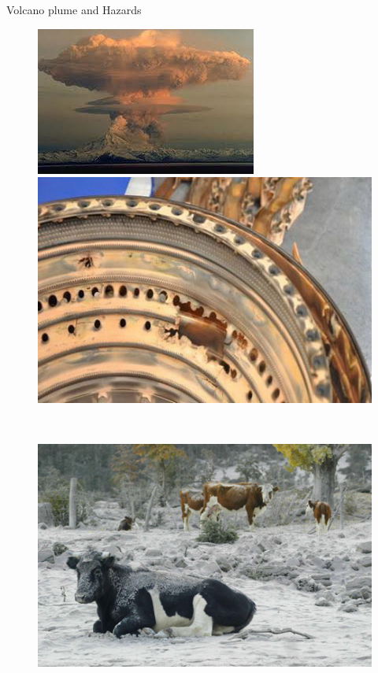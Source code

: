 \documentclass{beamer}
\begin{document}
\begin{frame}{Volcano plume and Hazards}
\noindent

\begin{figure}[!t]
\centering
\begin{minipage}{.49\textwidth}
\center
\includegraphics[width=.90\textwidth]{./PPT/Plume_pic}
\end{minipage}
\begin{minipage}{.49\textwidth}
\center
\includegraphics[width=.70\textwidth]{./PPT/BA-engine}
\end{minipage}
\\
\begin{minipage}{.32\textwidth}
\center
\includegraphics[width=.95\textwidth]{./PPT/Ash_community}

\end{minipage}
\end{figure}
\end{frame}
\end{document}
